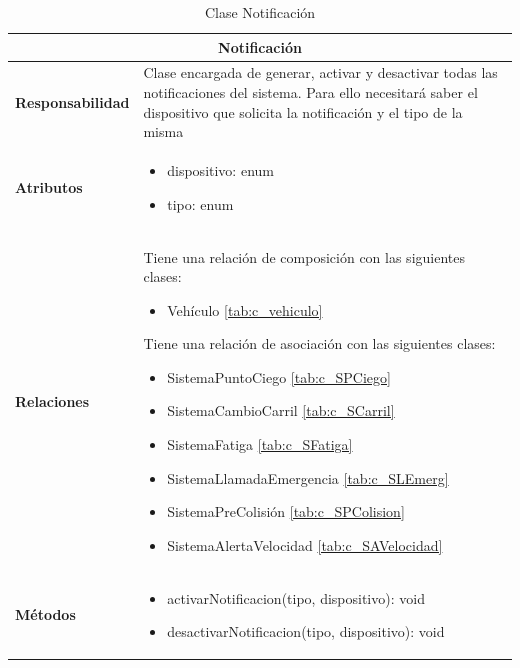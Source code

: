 \begin{table}[H]
\begin{center}
\begin{tabular}{p{} p{11cm}}
\multicolumn{2}{c}{\textbf{Notificación} } \\ \hline \hline
\textbf{Responsabilidad} &   Clase encargada de generar, activar y desactivar todas las notificaciones del sistema. Para ello necesitará saber el dispositivo que solicita la notificación y el tipo de la misma  \\ \hline
\textbf{Atributos} & \begin{itemize}
                      \item dispositivo: enum
                      \item tipo: enum
                    \end{itemize}\\ \hline
\textbf{Relaciones} & \par Tiene una relación de composición con las siguientes clases:
                      \begin{itemize}
                        \item Vehículo \ref{tab:c_vehiculo}
                      \end{itemize}

                      \par Tiene una relación de asociación con las siguientes clases:
                      \begin{itemize}
                        \item SistemaPuntoCiego \ref{tab:c_SPCiego}
                        \item SistemaCambioCarril \ref{tab:c_SCarril}
                        \item SistemaFatiga \ref{tab:c_SFatiga}
                        \item SistemaLlamadaEmergencia \ref{tab:c_SLEmerg}
                        \item SistemaPreColisión \ref{tab:c_SPColision}
                        \item SistemaAlertaVelocidad \ref{tab:c_SAVelocidad}
                      \end{itemize}

                      \\ \hline

\textbf{Métodos} &  \begin{itemize}
                      \item activarNotificacion(tipo, dispositivo): void
                      \item desactivarNotificacion(tipo, dispositivo): void
                    \end{itemize}\\ \hline
\end{tabular}
\caption{Clase Notificación}
\label{tab:c_Notificacion}
\end{center}
\end{table}
